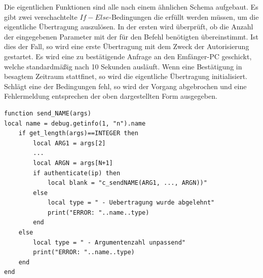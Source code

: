 \documentclass[12pt, a4paper]{scrartcl}
\begin{document}
Die eigentlichen Funktionen sind alle nach einem ähnlichen Schema aufgebaut. Es gibt zwei verschachtelte $If-Else$-Bedingungen die erfüllt werden müssen, um die eigentliche Übertragung auszulösen. In der ersten wird überprüft, ob die Anzahl der eingegebenen Parameter mit der für den Befehl benötigten übereinstimmt. Ist dies der Fall, so wird eine erste Übertragung mit dem Zweck der Autorisierung gestartet. Es wird eine zu bestätigende Anfrage an den Emfänger-PC geschickt, welche standardmäßig nach 10 Sekunden ausläuft. Wenn eine Bestätigung in besagtem Zeitraum stattfinet, so wird die eigentliche Übertragung initialisiert. Schlägt eine der Bedingungen fehl, so wird der Vorgang abgebrochen und eine Fehlermeldung entsprechen der oben dargestellten Form ausgegeben.
\begin{lstlisting}[caption = {Beispielhafte Sende Funktion}]
function send_NAME(args)
local name = debug.getinfo(1, "n").name
    if get_length(args)==INTEGER then
        local ARG1 = args[2]
        ...
        local ARGN = args[N+1]
        if authenticate(ip) then
            local blank = "c_sendNAME(ARG1, ..., ARGN))"
        else
        	local type = " - Uebertragung wurde abgelehnt"
            print("ERROR: "..name..type)
        end
    else
    	local type = " - Argumentenzahl unpassend"
        print("ERROR: "..name..type)
    end
end
\end{lstlisting}
\newpage
\end{document}
